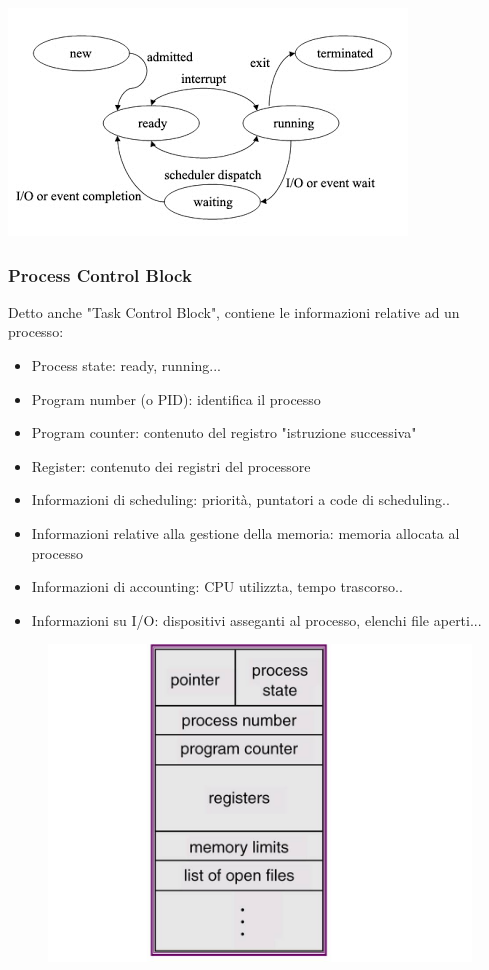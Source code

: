 \documentclass[11pt]{article}
\begin{document}
\includegraphics[scale=0.8]{processStateDiagram.jpg}

\subsubsection{Process Control Block}
Detto anche "Task Control Block", contiene le informazioni relative ad un processo:
\begin{itemize}
	\item Process state: ready, running...
	\item Program number (o PID): identifica il processo
	\item Program counter: contenuto del registro "istruzione successiva"
	\item Register: contenuto dei registri del processore
	\item Informazioni di scheduling: priorità, puntatori a code di scheduling..
	\item Informazioni relative alla gestione della memoria: memoria allocata al processo
	\item Informazioni di accounting: CPU utilizzta, tempo trascorso..
	\item Informazioni su I/O: dispositivi asseganti al processo, elenchi file aperti...
\end{itemize}
\begin{figure}[ht]
\includegraphics[scale=0.3]{ProcessControl.jpg}
\centering
\end{figure}
\end{document}

